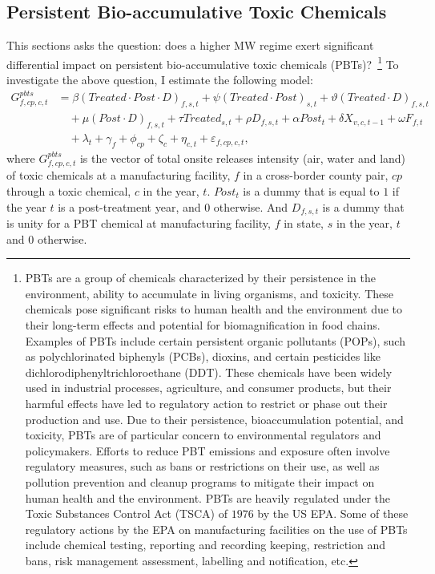 \documentclass[12pt, english]{article}
\begin{document}
    \subsection{Persistent Bio-accumulative Toxic Chemicals}\label{subsec:persistent-bioaccumulative-toxic-chemicals}
    This sections asks the question: does a higher MW regime exert significant differential impact on persistent bio-accumulative toxic chemicals (PBTs)?~\footnote{\tiny PBTs are a group of chemicals characterized by their persistence in the environment, ability to accumulate in living organisms, and toxicity. These chemicals pose significant risks to human health and the environment due to their long-term effects and potential for biomagnification in food chains. Examples of PBTs include certain persistent organic pollutants (POPs), such as polychlorinated biphenyls (PCBs), dioxins, and certain pesticides like dichlorodiphenyltrichloroethane (DDT). These chemicals have been widely used in industrial processes, agriculture, and consumer products, but their harmful effects have led to regulatory action to restrict or phase out their production and use. Due to their persistence, bioaccumulation potential, and toxicity, PBTs are of particular concern to environmental regulators and policymakers. Efforts to reduce PBT emissions and exposure often involve regulatory measures, such as bans or restrictions on their use, as well as pollution prevention and cleanup programs to mitigate their impact on human health and the environment. PBTs are heavily regulated under the Toxic Substances Control Act (TSCA) of $1976$ by the US EPA. Some of these regulatory actions by the EPA on manufacturing facilities on the use of PBTs include chemical testing, reporting and recording keeping, restriction and bans, risk management assessment, labelling and notification, etc.} To investigate the above question, I estimate the following model:
    \begin{align}
        G_{f,cp,c,t}^{pbts} &= \beta (Treated \cdot Post \cdot D)_{f,s,t} + \psi (Treated \cdot Post)_{s,t} + \vartheta (Treated \cdot D)_{f,s,t} \nonumber \\
        &\quad + \mu (Post \cdot D)_{f,s,t} + \tau Treated_{s,t} + \rho D_{f,s,t} + \alpha Post_{t} + \delta X_{v,c,t-1} + \omega F_{f,t} \nonumber \\
        &\quad + \lambda_{t} + \gamma_{f} + \phi_{cp} + \zeta_{c} + \eta_{c,t} + \varepsilon_{f,cp,c,t},\label{eq:heterogeneous-onsite-releases-intensity-pbts}
    \end{align}
    where $G_{f,cp,c,t}^{pbts}$ is the vector of total onsite releases intensity (air, water and land) of toxic chemicals at a manufacturing facility, $f$ in a cross-border county pair, $cp$ through a toxic chemical, $c$ in the year, $t$. $Post_{t}$ is a dummy that is equal to $1$ if the year $t$ is a post-treatment year, and $0$ otherwise. And $D_{f,s,t}$ is a dummy that is unity for a PBT chemical at manufacturing facility, $f$ in state, $s$ in the year, $t$ and $0$ otherwise.
    
\end{document}
